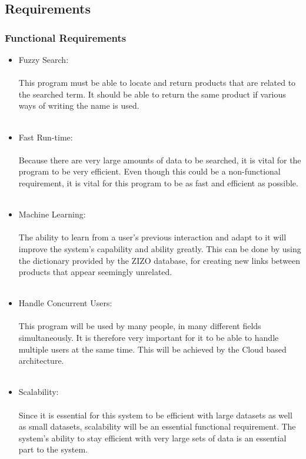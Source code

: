 \documentclass[a4paper,10pt]{article}
\begin{document}
	\subsection{Requirements}
	\subsubsection{Functional Requirements} 
		\begin{itemize}
		\item Fuzzy Search:\\\\
			This program must be able to locate and return products that are related to the searched term. It should be able to return the same product if various ways of writing the name is used.\\\\
	
		\item Fast Run-time:\\\\
			Because there are very large amounts of data to be searched, it is vital for the program to be very efficient.  Even though this could be a non-functional requirement, it is vital for this program to be as fast and efficient as possible.\\\\
			
		\item Machine Learning:\\\\
			The ability to learn from a user's previous interaction and adapt to it will improve the system’s capability and ability greatly. This can be done by using the dictionary provided by the ZIZO database, for creating new links between products that appear seemingly unrelated.\\\\
	
		\item Handle Concurrent Users:\\\\
			This program will be used by many people, in many different fields simultaneously. It is therefore very important for it to be able to handle multiple users at the same time. This will be achieved by the Cloud based architecture.\\\\
	
		\item Scalability:\\\\
			Since it is essential for this system to be efficient with large datasets as well as small datasets, scalability will be an essential functional requirement. The system’s ability to stay efficient with very large sets of data is an essential part to the system.
		 \end{itemize}
\end{document}
